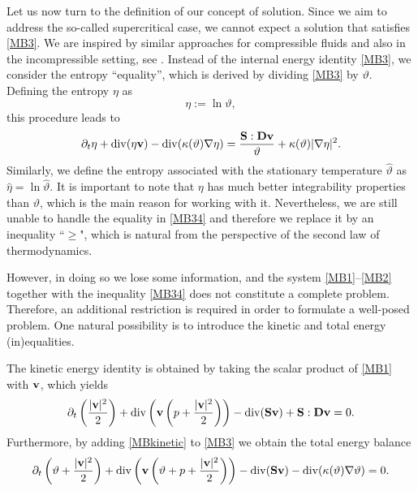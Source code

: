 \documentclass[11pt, a4paper, reqno]{amsart}
\numberwithin{equation}{section}
\newcommand{\diver}{\operatorname{div}}
\newcommand{\dert}{\partial_t}
\newcommand{\vc}[1]{{\bf #1}}
\newcommand{\vv}{\vc{v}}
\newcommand{\thet}{\vartheta}
\renewcommand{\S}{\mathbf{S}}
\newcommand{\D}{\mathbf{D}}
\begin{document}
Let us now turn to the definition of our concept of solution. Since we aim to address the so-called supercritical case, we cannot expect a solution that satisfies \eqref{MB3}. We are inspired by similar approaches for compressible fluids \cite{Fe04} and also in the incompressible setting, see \cite{BuFeMa2009,BuMaRa09}. Instead of the internal energy identity \eqref{MB3}, we consider the entropy ``equality'', which is derived by dividing \eqref{MB3} by $\thet$. Defining the entropy $\eta$ as
$$
\eta := \ln \thet,
$$
this procedure leads to
\begin{equation}
\dert \eta + \diver (\eta \vv) - \diver (\kappa(\thet)\nabla \eta) = \frac{\S : \D \vv}{\thet} + \kappa(\thet)|\nabla \eta|^2.
\label{MB34}
\end{equation}
Similarly, we define the entropy associated with the stationary temperature $\hat{\thet}$ as $\hat{\eta} = \ln \hat{\thet}$. It is important to note that $\eta$ has much better integrability properties than $\thet$, which is the main reason for working with it. Nevertheless, we are still unable to handle the equality in \eqref{MB34} and therefore we replace it by an inequality ``$\ge$", which is natural from the perspective of the second law of thermodynamics. 

However, in doing so we lose some information, and the system \eqref{MB1}--\eqref{MB2} together with the inequality \eqref{MB34} does not constitute a complete problem. Therefore, an additional restriction is required in order to formulate a well-posed problem. One natural possibility is to introduce the kinetic and total energy (in)equalities.

The kinetic energy identity is obtained by taking the scalar product of \eqref{MB1} with $\vv$, which yields
\begin{equation}\label{MBkinetic}
  \partial_t \left(\frac{|\vv|^2}{2}\right) 
  + \diver \left(\vv \left(p+\frac{|\vv|^2}{2}\right)\right) 
  - \diver (\S \vv) 
  + \S : \D\vv = 0.
\end{equation}
Furthermore, by adding \eqref{MBkinetic} to \eqref{MB3} we obtain the total energy balance
\begin{equation}\label{MBtotal}
  \partial_t \left(\thet + \frac{|\vv|^2}{2}\right) 
  + \diver \left(\vv \left(\thet + p+\frac{|\vv|^2}{2}\right)\right) 
  - \diver (\S \vv) 
  - \diver (\kappa(\thet)\nabla \thet) = 0.
\end{equation}
\end{document}
